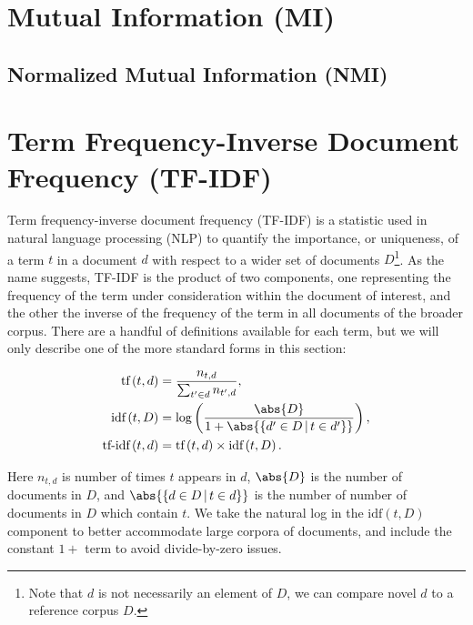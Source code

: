 \section{Mutual Information (MI)}
\label{dim_reduct:MI}

\subsection{Normalized Mutual Information (NMI)}
\label{dim_reduct:MI:normalized}

\section{Term Frequency-Inverse Document Frequency (TF-IDF)}
\label{dim_reduct:tfidf}

Term frequency-inverse document frequency (TF-IDF) is a statistic
used in natural language processing (NLP) to quantify
the importance, or uniqueness, of a term $t$ in a document $d$
with respect to a wider set of documents $D$\footnote{Note that $d$ is not necessarily an element of $D$, we can compare novel $d$ to a reference corpus $D$.}.
As the name suggests, TF-IDF is the product of two components,
one representing the frequency of the term under consideration within the document of interest,
and the other the inverse of the frequency of the term in all documents of the broader corpus.
There are a handful of definitions available for each term, but we will only describe
one of the more standard forms in this section:

\begin{subequations}\label{eq:unsupervised:tfidf}
\begin{align}
\text{tf}\left(t,d\right) &= \frac{n_{t,d}}{\sum_{t' \in d} n_{t',d}}, \label{eq:unsupervised:tfidf:tf} \\
\text{idf}\left(t,D\right) &= \log\left(\frac{\abs{D}}{1 + \abs{\left\{d' \in D \, | \, t \in d'\right\}}}\right), \label{eq:unsupervised:tfidf:idf} \\
\text{tf-idf}\left(t,d\right) &= \text{tf}\left(t,d\right) \times \text{idf}\left(t,D\right). \label{eq:unsupervised:tfidf:tfidf}
\end{align}
\end{subequations}

\noindent Here $n_{t,d}$ is number of times $t$ appears in $d$,
$\abs{D}$ is the number of documents in $D$,
and $\abs{\left\{d \in D \, | \, t \in d\right\}}$ is the number of number of documents in $D$ which contain $t$.
We take the natural log in the $\text{idf}\left(t,D\right)$ component to better accommodate large corpora of documents,
and include the constant $1+$ term to avoid divide-by-zero issues.


